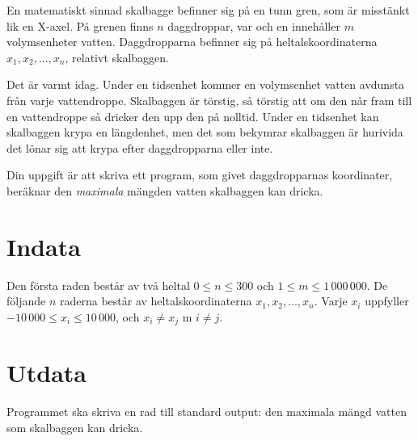 
En matematiskt sinnad skalbagge befinner sig på en tunn gren, som är misstänkt lik en X-axel. På grenen finns $n$ daggdroppar, var och en innehåller $m$ volymsenheter vatten. Daggdropparna befinner sig på heltalskoordinaterna $x_1, x_2, ..., x_n$, relativt skalbaggen.

Det är varmt idag. Under en tidsenhet kommer en volymsenhet vatten avdunsta från varje vattendroppe. Skalbaggen är törstig, så törstig att om den når fram till en vattendroppe så dricker den upp den på nolltid. Under en tidsenhet kan skalbaggen krypa en längdenhet, men det som bekymrar skalbaggen är hurivida det lönar sig att krypa efter daggdropparna eller inte.

Din uppgift är att skriva ett program, som givet daggdropparnas koordinater, beräknar den \emph{maximala} mängden vatten skalbaggen kan dricka.

\section*{Indata}
Den första raden består av två heltal $0 \le n \le 300$ och $1 \le m \le 1\,000\,000$. De följande $n$ raderna består av heltalskoordinaterna $x_1, x_2, ..., x_n$. Varje $x_i$ uppfyller $-10\,000 \le x_i \le 10\,000$, och $x_i \not= x_j$ m $i \not= j$.

\section*{Utdata}
Programmet ska skriva en rad till standard output: den maximala mängd vatten som skalbaggen kan dricka.

